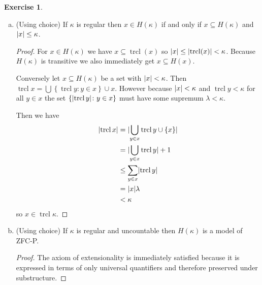 \documentclass{article}
\theoremstyle{definition}
\newtheorem{question}{Exercise}
\newcommand{\set}[1]{\left\{#1\right\}}
\newcommand{\setwith}[2]{\set{#1\colon#2}}
\DeclareMathOperator{\trcl}{trcl}
\DeclarePairedDelimiter{\abs}{|}{|}
\begin{document}
\begin{question}
\begin{enumerate}[a.]
\begin{proof}
                  This proves \(H(\kappa)\) is closed under \(G_{9}\) and
                  \(G_{10}\) as well so \(H(\kappa)\) is closed under all Gödel
                  operations.
              \end{proof}

        \item (Using choice) If \(\kappa\) is regular then \(x\in H(\kappa)\) if
              and only if \(x\subseteq H(\kappa)\) and \(\abs{x}\leq\kappa\).

              \begin{proof}
                  For \(x\in H(\kappa)\) we have \(x\subseteq\trcl(x)\) so
                  \(\abs{x}\leq\abs{\trcl(x)}<\kappa\). Because \(H(\kappa)\) is
                  transitive we also immediately get \(x\subseteq H(x)\).

                  Conversely let \(x\subseteq H(\kappa)\) be a set with
                  \(\abs{x}<\kappa\). Then
                  \(\trcl{x}=\bigcup\setwith{\trcl{y}}{y\in x}\cup{x}\). However
                  because \(\abs{x}<\kappa\) and \(\trcl{y}<\kappa\) for all
                  \(y\in x\) the set \(\setwith{\abs{\trcl{y}}}{y\in x}\) must
                  have some supremum \(\lambda<\kappa\).

                  Then we have
                  \begin{align*}
                      \abs{\trcl{x}} & =\abs{\bigcup_{y\in x} \trcl{y}\cup\set{x}} \\
                                     & =\abs{\bigcup_{y\in x} \trcl{y}}+1          \\
                                     & \leq\sum_{y\in x}\abs{\trcl{y}}             \\
                                     & =\abs{x}\lambda                             \\
                                     & <\kappa
                  \end{align*}
                  so \(x\in\trcl{\kappa}\).
              \end{proof}

        \item (Using choice) If \(\kappa\) is regular and uncountable then
              \(H(\kappa)\) is a model of ZFC-P.

              \begin{proof}
                  The axiom of extensionality is immediately satisfied because
                  it is expressed in terms of only universal quantifiers and
                  therefore preserved under substructure.


\end{proof}
\end{enumerate}
\end{question}
\end{document}
